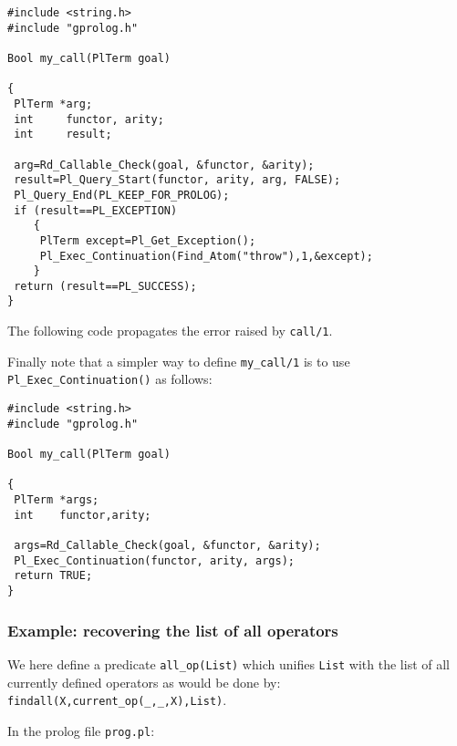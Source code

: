 \begin{Indentation}
\begin{verbatim}
#include <string.h>
#include "gprolog.h"

Bool my_call(PlTerm goal)

{
 PlTerm *arg;
 int     functor, arity;
 int     result;

 arg=Rd_Callable_Check(goal, &functor, &arity);
 result=Pl_Query_Start(functor, arity, arg, FALSE);
 Pl_Query_End(PL_KEEP_FOR_PROLOG);
 if (result==PL_EXCEPTION)
    {
     PlTerm except=Pl_Get_Exception();
     Pl_Exec_Continuation(Find_Atom("throw"),1,&except);
    }
 return (result==PL_SUCCESS);
}
\end{verbatim}
\end{Indentation}

The following code propagates the error raised by \texttt{call/1}.

\begin{CodeTwoCols}
\end{CodeTwoCols}

Finally note that a simpler way to define \texttt{my\_call/1} is to use 
\texttt{Pl\_Exec\_Continuation()} as follows:

\begin{Indentation}
\begin{verbatim}
#include <string.h>
#include "gprolog.h"

Bool my_call(PlTerm goal)

{
 PlTerm *args;
 int    functor,arity;

 args=Rd_Callable_Check(goal, &functor, &arity);
 Pl_Exec_Continuation(functor, arity, args);
 return TRUE;
}
\end{verbatim}
\end{Indentation}

\subsubsection{Example: recovering the list of all operators}

We here define a predicate \texttt{all\_op(List)} which unifies
\texttt{List} with the list of all currently defined operators as would be done by: \texttt{findall(X,current\_op(\_,\_,X),List)}.

In the prolog file \texttt{prog.pl}:


